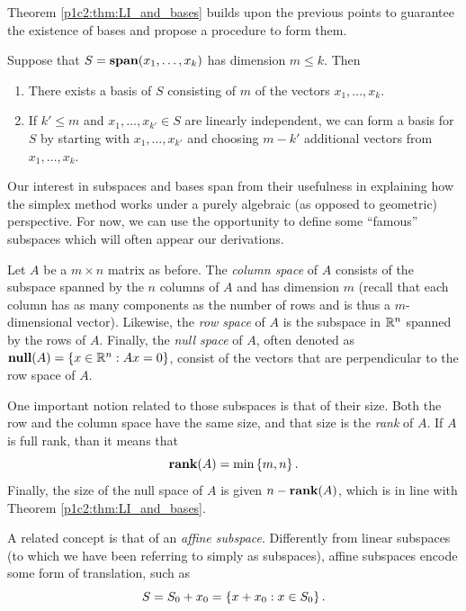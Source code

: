 Theorem \ref{p1c2:thm:LI_and_bases} builds upon the previous points to guarantee the existence of bases and propose a procedure to form them.

\begin{theorem}\label{p1c2:thm:LI_and_bases}
	Suppose that $S = \mathop{\bf span}(x_1,\dots, x_k)$ has dimension $m \leq k$. Then
	\begin{enumerate}
		\item There exists a basis of $S$ consisting of $m$ of the vectors $x_1,\dots, x_k$.
		\item If $k' \leq m$ and $x_1,\dots, x_{k'} \in S$ are linearly independent, we can form a basis for $S$ by starting with $x_1,\dots, x_{k'}$ and choosing $m-{k'}$ additional vectors from $x_1,\dots, x_k$.
	\end{enumerate}	
\end{theorem}


Our interest in subspaces and bases span from their usefulness in explaining how the simplex method works under a purely algebraic (as opposed to geometric) perspective. For now, we can use the opportunity to define some ``famous'' subspaces which will often appear our derivations. 

Let $A$ be a $m \times n$ matrix as before. The \emph{column space} of $A$ consists of the subspace spanned by the $n$ columns of $A$ and has dimension $m$ (recall that each column has as many components as the number of rows and is thus a $m$-dimensional vector). Likewise, the \emph{row space} of $A$ is the subspace in $\mathbb{R}^n$ spanned by the rows of $A$. Finally, the \emph{null space} of $A$, often denoted as $\mathop{\bf null}(A) = \left\{ x \in \mathbb{R}^n : Ax = 0 \right \}$, consist of the vectors that are perpendicular to the row space of $A$. 

One important notion related to those subspaces is that of their size. Both the row and the column space have the same size, and that size is the \emph{rank} of $A$. If $A$ is full rank, than it means that 
%
\begin{equation*}
	\mathop{\bf rank}(A) = \min \left\{ m,n \right \}. 		
\end{equation*}
%
Finally, the size of the null space of $A$ is given $n - \mathop{\bf rank}(A)$, which is in line with Theorem \ref{p1c2:thm:LI_and_bases}.

A related concept is that of an \emph{affine subspace}. Differently from linear subspaces (to which we have been referring to simply as subspaces), affine subspaces encode some form of translation, such as  
%
\begin{equation*}
	S = S_0 + x_0 = \left\{ x + x_0 : x \in S_0 \right \}.
\end{equation*}
%

